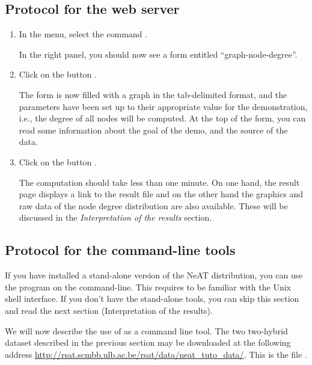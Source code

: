 \subsection{Protocol for the web server}

\begin{enumerate}

\item In the \neat menu, select the command . 

  In the right panel, you should now see a form entitled
  ``graph-node-degree''.

\item Click on the button . 

  The form is now filled with a graph in the tab-delimited format, and the parameters have been
  set up to their appropriate value for the demonstration, i.e., the degree of all nodes will be computed. 
  At the top of the form, you can read some information about the goal of the
  demo, and the source of the data.

\item Click on the button . 

  The computation should take less than one minute. On one hand, the result page
  displays a link to the result file and on the other hand the graphics and raw data of the node degree distribution are also available. These will be discussed in the \textit{Interpretation of the results} section.

\end{enumerate}

\subsection{Protocol for the command-line tools}

If you have installed a stand-alone version of the NeAT distribution,
you can use the program  on the
command-line. This requires to be familiar with the Unix shell
interface. If you don't have the stand-alone tools, you can skip this
section and read the next section (Interpretation of the results).

We will now describe the use of  as a command line tool. 
The two two-hybrid dataset described
in the previous section may be downloaded at the following address \url{http://rsat.scmbb.ulb.ac.be/rsat/data/neat\_tuto\_data/}. 
This is the file .

